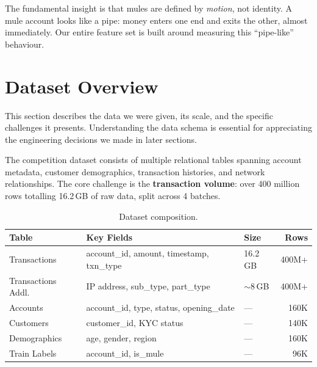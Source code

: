 \documentclass[11pt, a4paper]{article}
\begin{document}
\begin{insightbox}
The fundamental insight is that mules are defined by \emph{motion}, not identity. A mule
account looks like a pipe: money enters one end and exits the other, almost immediately. Our
entire feature set is built around measuring this ``pipe-like'' behaviour.
\end{insightbox}


\section{Dataset Overview}

This section describes the data we were given, its scale, and the specific challenges it
presents. Understanding the data schema is essential for appreciating the engineering
decisions we made in later sections.

\medskip

The competition dataset consists of multiple relational tables spanning account metadata,
customer demographics, transaction histories, and network relationships. The core challenge
is the \textbf{transaction volume}: over 400 million rows totalling 16.2\,GB of raw data,
split across 4 batches.

\begin{table}[H]
\centering\small
\caption{Dataset composition.}
\begin{tabular}{@{}lllr@{}}
\toprule
\textbf{Table} & \textbf{Key Fields} & \textbf{Size} & \textbf{Rows} \\
\midrule
Transactions       & account\_id, amount, timestamp, txn\_type & 16.2\,GB & 400M+ \\
Transactions Addl. & IP address, sub\_type, part\_type          & $\sim$8\,GB & 400M+ \\
Accounts           & account\_id, type, status, opening\_date   & ---      & 160K \\
Customers          & customer\_id, KYC status                   & ---      & 140K \\
Demographics       & age, gender, region                        & ---      & 160K \\
Train Labels       & account\_id, is\_mule                      & ---      & 96K \\
\bottomrule
\end{tabular}
\end{table}
\end{document}
